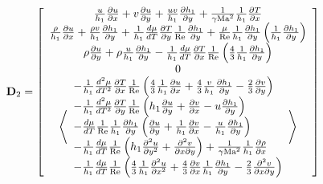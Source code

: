 \begin{equation*}
  {\bf{D}}_2  = \left[ {\begin{array}{*{20}c}
   {\frac{u}{{h_1 }}\frac{{\partial u}}{{\partial x}} + v\frac{{\partial u}}{{\partial y}} + \frac{{uv}}{{h_1 }}\frac{{\partial h_1 }}{{\partial y}} + \frac{1}{{\gamma {\rm{Ma}}^2 }}\frac{1}{{h_1 }}\frac{{\partial T}}{{\partial x}}}  \\
   {\frac{\rho }{{h_1 }}\frac{{\partial u}}{{\partial x}} + \frac{{\rho v}}{{h_1 }}\frac{{\partial h_1 }}{{\partial y}} + \frac{1}{{h_1 }}\frac{{d\mu }}{{dT}}\frac{{\partial T}}{{\partial y}}\frac{1}{{{\mathop{\rm Re}\nolimits} }}\frac{{\partial h_1 }}{{\partial y}} + \frac{\mu }{{{\mathop{\rm Re}\nolimits} }}\frac{1}{{h_1 }}\frac{{\partial h_1 }}{{\partial y}}\left( {\frac{1}{{h_1 }}\frac{{\partial h_1 }}{{\partial y}}} \right)}  \\
   {\rho \frac{{\partial u}}{{\partial y}} + \rho \frac{u}{{h_1 }}\frac{{\partial h_1 }}{{\partial y}} - \frac{1}{{h_1 }}\frac{{d\mu }}{{dT}}\frac{{\partial T}}{{\partial x}}\frac{1}{{{\mathop{\rm Re}\nolimits} }}\left( {\frac{4}{3}\frac{1}{{h_1 }}\frac{{\partial h_1 }}{{\partial y}}} \right)}  \\
   0  \\
   {\left\langle \begin{array}{l}
  - \frac{1}{{h_1 }}\frac{{d^2 \mu }}{{dT^2 }}\frac{{\partial T}}{{\partial x}}\frac{1}{{{\mathop{\rm Re}\nolimits} }}\left( {\frac{4}{3}\frac{1}{{h_1 }}\frac{{\partial u}}{{\partial x}} + \frac{4}{3}\frac{v}{{h_1 }}\frac{{\partial h_1 }}{{\partial y}} - \frac{2}{3}\frac{{\partial v}}{{\partial y}}} \right) \\
  - \frac{1}{{h_1 }}\frac{{d^2 \mu }}{{dT^2 }}\frac{{\partial T}}{{\partial y}}\frac{1}{{{\mathop{\rm Re}\nolimits} }}\left( {h_1 \frac{{\partial u}}{{\partial y}} + \frac{{\partial v}}{{\partial x}} - u\frac{{\partial h_1 }}{{\partial y}}} \right) \\
  - \frac{{d\mu }}{{dT}}\frac{1}{{{\mathop{\rm Re}\nolimits} }}\frac{1}{{h_1 }}\frac{{\partial h_1 }}{{\partial y}}\left( {\frac{{\partial u}}{{\partial y}} + \frac{1}{{h_1 }}\frac{{\partial v}}{{\partial x}} - \frac{u}{{h_1 }}\frac{{\partial h_1 }}{{\partial y}}} \right) \\
  - \frac{1}{{h_1 }}\frac{{d\mu }}{{dT}}\frac{1}{{{\mathop{\rm Re}\nolimits} }}\left( {h_1 \frac{{\partial ^2 u}}{{\partial y^2 }} + \frac{{\partial ^2 v}}{{\partial x\partial y}}} \right) + \frac{1}{{\gamma {\rm{Ma}}^2 }}\frac{1}{{h_1 }}\frac{{\partial \rho }}{{\partial x}} \\
  - \frac{1}{{h_1 }}\frac{{d\mu }}{{dT}}\frac{1}{{{\mathop{\rm Re}\nolimits} }}\left( {\frac{4}{3}\frac{1}{{h_1 }}\frac{{\partial ^2 u}}{{\partial x^2 }} + \frac{4}{3}\frac{{\partial v}}{{\partial x}}\frac{1}{{h_1 }}\frac{{\partial h_1 }}{{\partial y}} - \frac{2}{3}\frac{{\partial ^2 v}}{{\partial x\partial y}}} \right) \\
 \end{array} \right\rangle }  \\
\end{array}} \right]
\end{equation*}
